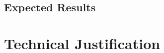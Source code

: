 \documentclass[11pt, a4paper, onecolumn]{article}
\begin{document}
\begin{multicols}{2}
\subsection{Expected Results}

\section{Technical Justification}

\end{multicols}
\end{document}
